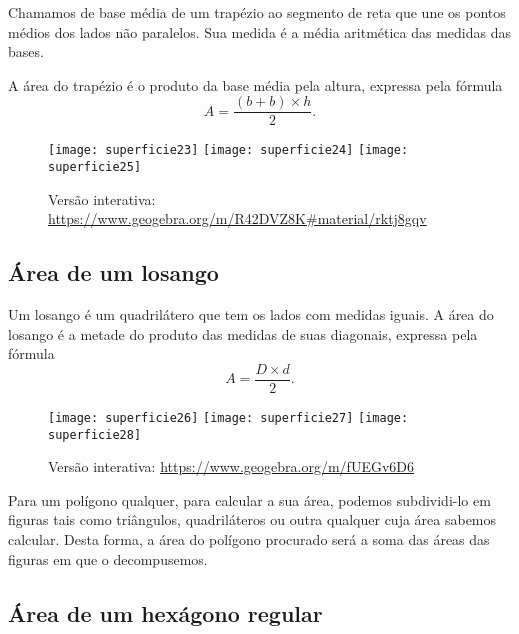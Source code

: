 Chamamos de base média de um trapézio ao segmento de reta que une os pontos médios dos lados não paralelos. Sua medida é a média aritmética das medidas das bases.

A área do trapézio é o produto da base média pela altura, expressa pela fórmula 
\begin{equation*}
A=\frac{(b+b)\times h}{2}.
\end{equation*}

\begin{figure}[H]
\centering

\texttt{[image: superficie23]}
\hspace{.5em}
\texttt{[image: superficie24]}
\hspace{.5em}
\texttt{[image: superficie25]}

\caption{Versão interativa: \url{https://www.geogebra.org/m/R42DVZ8K\#material/rktj8gqv}}
\end{figure}

\subsection{ Área de um losango}

Um losango é um quadrilátero que tem os lados com medidas iguais. A área do losango é a metade do produto das medidas de suas diagonais, expressa pela fórmula  
\begin{equation*}
A=\frac{D\times d}{2}.
\end{equation*}

\begin{figure}[H]
\centering

\texttt{[image: superficie26]}
\hspace{.5em}
\texttt{[image: superficie27]}
\hspace{.5em}
\texttt{[image: superficie28]}

\caption{Versão interativa: \url{https://www.geogebra.org/m/fUEGv6D6}}
\end{figure}

Para um polígono qualquer, para calcular a sua área, podemos subdividi-lo em figuras tais como triângulos, quadriláteros ou outra qualquer cuja área sabemos calcular. Desta forma, a área do polígono procurado será a soma das áreas das figuras em que o decompusemos.

\subsection{ Área de um hexágono regular}

